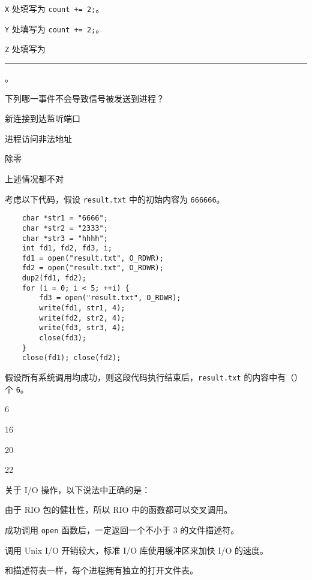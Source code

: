 \begin{problems}
\begin{compactitem}
            \item \verb|X| 处填写为 \verb|count += 2;|。
            \item \verb|Y| 处填写为 \verb|count += 2;|。
            \item \verb|Z| 处填写为 \rule{6cm}{0.25mm}。
        \end{compactitem}
         下列哪一事件不会导致信号被发送到进程？
        \begin{choices}
            \item 新连接到达监听端口
            \item 进程访问非法地址
            \item 除零
            \item 上述情况都不对
        \end{choices}
         考虑以下代码，假设 \verb|result.txt| 中的初始内容为 \verb|666666|。
        \begin{verbatim}
    char *str1 = "6666";
    char *str2 = "2333";
    char *str3 = "hhhh";
    int fd1, fd2, fd3, i;
    fd1 = open("result.txt", O_RDWR);
    fd2 = open("result.txt", O_RDWR);
    dup2(fd1, fd2);
    for (i = 0; i < 5; ++i) {
        fd3 = open("result.txt", O_RDWR);
        write(fd1, str1, 4);
        write(fd2, str2, 4);
        write(fd3, str3, 4);
        close(fd3);
    }
    close(fd1); close(fd2);
        \end{verbatim}
        假设所有系统调用均成功，则这段代码执行结束后，\verb|result.txt| 的内容中有（\qquad）个 \verb|6|。
        \begin{choices}
            \item 6
            \item 16
            \item 20
            \item 22
        \end{choices}
         关于 I/O 操作，以下说法中正确的是：
        \begin{choices}
            \item 由于 RIO 包的健壮性，所以 RIO 中的函数都可以交叉调用。
            \item 成功调用 \verb|open| 函数后，一定返回一个不小于 3 的文件描述符。
            \item 调用 Unix I/O 开销较大，标准 I/O 库使用缓冲区来加快 I/O 的速度。
            \item 和描述符表一样，每个进程拥有独立的打开文件表。
        \end{choices}

\end{problems}
